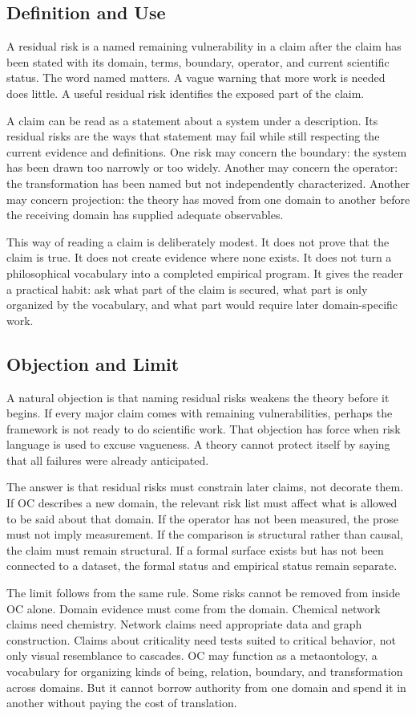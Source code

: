 \documentclass[11pt,a4paper,openany]{book}
\begin{document}
\subsection{Definition and Use}
A residual risk is a named remaining vulnerability in a claim after the claim has been stated with its domain, terms, boundary, operator, and current scientific status. The word named matters. A vague warning that more work is needed does little. A useful residual risk identifies the exposed part of the claim. \cite{kauffman_autocatalytic,raf_networks}\par
A claim can be read as a statement about a system under a description. Its residual risks are the ways that statement may fail while still respecting the current evidence and definitions. One risk may concern the boundary: the system has been drawn too narrowly or too widely. Another may concern the operator: the transformation has been named but not independently characterized. Another may concern projection: the theory has moved from one domain to another before the receiving domain has supplied adequate observables.\par
This way of reading a claim is deliberately modest. It does not prove that the claim is true. It does not create evidence where none exists. It does not turn a philosophical vocabulary into a completed empirical program. It gives the reader a practical habit: ask what part of the claim is secured, what part is only organized by the vocabulary, and what part would require later domain-specific work.\par
\subsection{Objection and Limit}
A natural objection is that naming residual risks weakens the theory before it begins. If every major claim comes with remaining vulnerabilities, perhaps the framework is not ready to do scientific work. That objection has force when risk language is used to excuse vagueness. A theory cannot protect itself by saying that all failures were already anticipated. \cite{kauffman_autocatalytic,raf_networks}\par
The answer is that residual risks must constrain later claims, not decorate them. If OC describes a new domain, the relevant risk list must affect what is allowed to be said about that domain. If the operator has not been measured, the prose must not imply measurement. If the comparison is structural rather than causal, the claim must remain structural. If a formal surface exists but has not been connected to a dataset, the formal status and empirical status remain separate.\par
The limit follows from the same rule. Some risks cannot be removed from inside OC alone. Domain evidence must come from the domain. Chemical network claims need chemistry. Network claims need appropriate data and graph construction. Claims about criticality need tests suited to critical behavior, not only visual resemblance to cascades. OC may function as a metaontology, a vocabulary for organizing kinds of being, relation, boundary, and transformation across domains. But it cannot borrow authority from one domain and spend it in another without paying the cost of translation.\par
\end{document}
